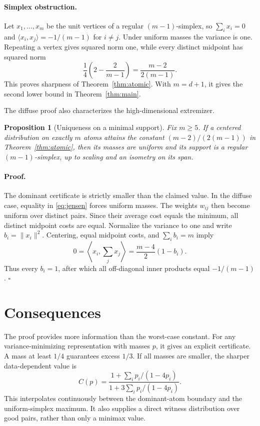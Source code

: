 \documentclass[twoside]{article}
\newtheorem{proposition}[theorem]{Proposition}
\begin{document}
\paragraph{Simplex obstruction.}
Let $x_1,\ldots,x_m$ be the unit vertices of a regular $(m-1)$-simplex, so $\sum_i x_i=0$ and $\langle x_i,x_j\rangle=-1/(m-1)$ for $i\ne j$. Under uniform masses the variance is one. Repeating a vertex gives squared norm one, while every distinct midpoint has squared norm \[ \frac14\left(2-\frac{2}{m-1}\right) =\frac{m-2}{2(m-1)}. \] This proves sharpness of Theorem~\ref{thm:atomic}. With $m=d+1$, it gives the second lower bound in Theorem~\ref{thm:main}.

The diffuse proof also characterizes the high-dimensional extremizer.

\begin{proposition}[Uniqueness on a minimal support]\label{prop:unique}
Fix $m\geq5$. If a centered distribution on exactly $m$ atoms attains the constant $(m-2)/(2(m-1))$ in Theorem~\ref{thm:atomic}, then its masses are uniform and its support is a regular $(m-1)$-simplex, up to scaling and an isometry on its span.
\end{proposition}

\paragraph{Proof.}
The dominant certificate is strictly smaller than the claimed value. In the diffuse case, equality in \eqref{eq:jensen} forces uniform masses. The weights $w_{ij}$ then become uniform over distinct pairs. Since their average cost equals the minimum, all distinct midpoint costs are equal. Normalize the variance to one and write $b_i=\|x_i\|^2$. Centering, equal midpoint costs, and $\sum_i b_i=m$ imply \[ 0=\left\langle x_i,\sum_jx_j\right\rangle =\frac{m-4}{2}(1-b_i). \] Thus every $b_i=1$, after which all off-diagonal inner products equal $-1/(m-1)$. \hfill$\square$

\section{Consequences}\label{sec:consequences}

The proof provides more information than the worst-case constant. For any variance-minimizing representation with masses $p$, it gives an explicit certificate. A mass at least $1/4$ guarantees excess $1/3$. If all masses are smaller, the sharper data-dependent value is
\begin{equation}\label{eq:adaptive}
 C(p)=\frac{1+\sum_i p_i/(1-4p_i)}
 {1+3\sum_i p_i/(1-4p_i)}.
\end{equation}
This interpolates continuously between the dominant-atom boundary and the uniform-simplex maximum. It also supplies a direct witness distribution over good pairs, rather than only a minimax value.
\end{document}
